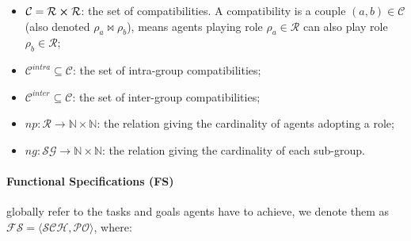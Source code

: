 \documentclass[doubleblind]{ecai}
\newcounter{relation}
\begin{document}
\begin{itemize}
\begin{itemize}
              \item $\mathcal{C} = \mathcal{R} \cross \mathcal{R}$: the set of compatibilities. A compatibility is a couple $(a,b) \in \mathcal{C}$ (also denoted $\rho_a \bowtie \rho_b$), means agents playing role $\rho_a \in \mathcal{R}$ can also play role $\rho_b \in \mathcal{R}$;
              \item $\mathcal{C}^{intra} \subseteq \mathcal{C}$: the set of intra-group compatibilities;
              \item $\mathcal{C}^{inter} \subseteq \mathcal{C}$: the set of inter-group compatibilities;

              \item $np: \mathcal{R} \rightarrow \mathbb{N} \times \mathbb{N}$: the relation giving the cardinality of agents adopting a role;
              \item $ng: \mathcal{SG} \rightarrow \mathbb{N} \times \mathbb{N}$: the relation giving the cardinality of each sub-group.

          \end{itemize}

\end{itemize}

\paragraph{\textbf{Functional Specifications (FS)}} globally refer to the tasks and goals agents have to achieve, we denote them as $\mathcal{FS} = \langle \mathcal{SCH}, \mathcal{PO} \rangle$, where:
\end{document}
